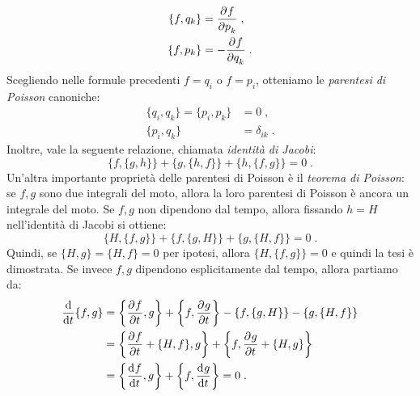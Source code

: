 \begin{align}
\{f,q_k\} &= \frac{\partial^{}f}{\partial p_k^{}}\;, \\
\{f,p_k\} &= -\frac{\partial^{}f}{\partial q_k^{}}\;.
\end{align}
Scegliendo nelle formule precedenti $f=q_i$ o $f=p_i$, otteniamo le \emph{parentesi di Poisson} canoniche:
\begin{align}
\{q_i,q_k\} =\{p_i,p_k\} &=0\;, \\
\{p_i,q_k\} &=\delta_{ik}\;.
\end{align}
Inoltre, vale la seguente relazione, chiamata \emph{identità di Jacobi}:
\begin{equation}
\{f,\{g,h\}\}+\{g,\{h,f\}\}+\{h,\{f,g\}\}=0\;.
\end{equation}
Un'altra importante proprietà delle parentesi di Poisson è il \emph{teorema di Poisson}: se $f,g$ sono due integrali del moto, allora la loro parentesi di Poisson è ancora un integrale del moto. Se $f,g$ non dipendono dal tempo, allora fissando $h=H$ nell'identità di Jacobi si ottiene:
\begin{equation}
\{H,\{f,g\}\}+\{f,\{g,H\}\}+\{g,\{H,f\}\}=0\;.
\end{equation}
Quindi, se $\{H,g\}=\{H,f\}=0$ per ipotesi, allora $\{H,\{f,g\}\}=0$ e quindi la tesi è dimostrata. Se invece $f,g$ dipendono esplicitamente dal tempo, allora partiamo da:
\begin{align}
\frac{\mathrm{d}}{\mathrm{d}{t}}\{f,g\} &= \left\{\frac{\partial^{}f}{\partial t^{}},g\right\}+\left\{f,\frac{\partial^{}g}{\partial t^{}}\right\}-\{f,\{g,H\}\}-\{g,\{H,f\}\} \notag \\
&= \left\{\frac{\partial^{}f}{\partial t^{}}+\{H,f\},g\right\}+\left\{f,\frac{\partial^{}g}{\partial t^{}}+\{H,g\}\right\}\notag \\
&=\left\{\frac{\mathrm{d}^{}f}{\mathrm{d}t^{}},g\right\}+\left\{f,\frac{\mathrm{d}^{}g}{\mathrm{d}t^{}}\right\}=0\;.
\end{align}